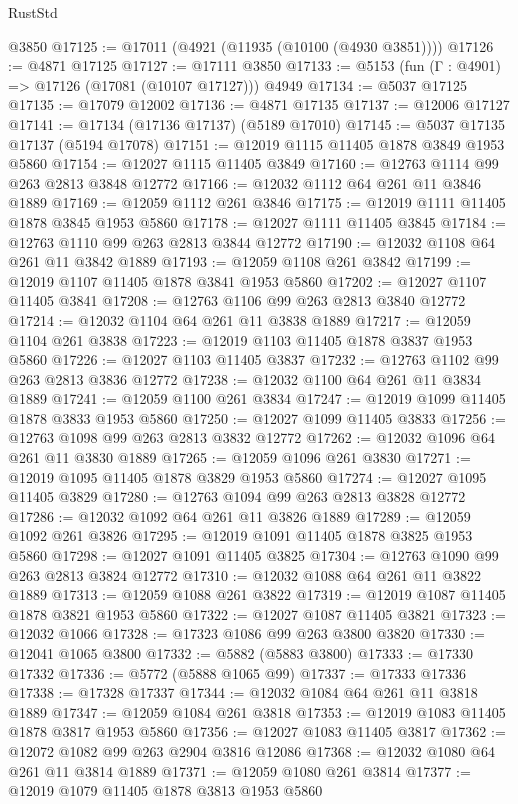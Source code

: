 \begin{lexlean}{RustStd}
\begin{coremodule}
{\begin{coremodule}
{{{{{{{{{{{{{{{{{{{{{{{{{{{{{    @3850
@17125 := @17011 (@4921 (@11935 (@10100 (@4930 @3851))))
@17126 := @4871 @17125
@17127 := @17111 @3850
@17133 := @5153 (fun (Γ : @4901) => @17126 (@17081 (@10107 @17127))) @4949
@17134 := @5037 @17125
@17135 := @17079 @12002
@17136 := @4871 @17135
@17137 := @12006 @17127
@17141 := @17134 (@17136 @17137) (@5189 @17010)
@17145 := @5037 @17135 @17137 (@5194 @17078)
@17151 := @12019 @1115 @11405 @1878 @3849 @1953 @5860
@17154 := @12027 @1115 @11405 @3849
@17160 := @12763 @1114 @99 @263 @2813 @3848 @12772
@17166 := @12032 @1112 @64 @261 @11 @3846 @1889
@17169 := @12059 @1112 @261 @3846
@17175 := @12019 @1111 @11405 @1878 @3845 @1953 @5860
@17178 := @12027 @1111 @11405 @3845
@17184 := @12763 @1110 @99 @263 @2813 @3844 @12772
@17190 := @12032 @1108 @64 @261 @11 @3842 @1889
@17193 := @12059 @1108 @261 @3842
@17199 := @12019 @1107 @11405 @1878 @3841 @1953 @5860
@17202 := @12027 @1107 @11405 @3841
@17208 := @12763 @1106 @99 @263 @2813 @3840 @12772
@17214 := @12032 @1104 @64 @261 @11 @3838 @1889
@17217 := @12059 @1104 @261 @3838
@17223 := @12019 @1103 @11405 @1878 @3837 @1953 @5860
@17226 := @12027 @1103 @11405 @3837
@17232 := @12763 @1102 @99 @263 @2813 @3836 @12772
@17238 := @12032 @1100 @64 @261 @11 @3834 @1889
@17241 := @12059 @1100 @261 @3834
@17247 := @12019 @1099 @11405 @1878 @3833 @1953 @5860
@17250 := @12027 @1099 @11405 @3833
@17256 := @12763 @1098 @99 @263 @2813 @3832 @12772
@17262 := @12032 @1096 @64 @261 @11 @3830 @1889
@17265 := @12059 @1096 @261 @3830
@17271 := @12019 @1095 @11405 @1878 @3829 @1953 @5860
@17274 := @12027 @1095 @11405 @3829
@17280 := @12763 @1094 @99 @263 @2813 @3828 @12772
@17286 := @12032 @1092 @64 @261 @11 @3826 @1889
@17289 := @12059 @1092 @261 @3826
@17295 := @12019 @1091 @11405 @1878 @3825 @1953 @5860
@17298 := @12027 @1091 @11405 @3825
@17304 := @12763 @1090 @99 @263 @2813 @3824 @12772
@17310 := @12032 @1088 @64 @261 @11 @3822 @1889
@17313 := @12059 @1088 @261 @3822
@17319 := @12019 @1087 @11405 @1878 @3821 @1953 @5860
@17322 := @12027 @1087 @11405 @3821
@17323 := @12032 @1066
@17328 := @17323 @1086 @99 @263 @3800 @3820
@17330 := @12041 @1065 @3800
@17332 := @5882 (@5883 @3800)
@17333 := @17330 @17332
@17336 := @5772 (@5888 @1065 @99)
@17337 := @17333 @17336
@17338 := @17328 @17337
@17344 := @12032 @1084 @64 @261 @11 @3818 @1889
@17347 := @12059 @1084 @261 @3818
@17353 := @12019 @1083 @11405 @1878 @3817 @1953 @5860
@17356 := @12027 @1083 @11405 @3817
@17362 := @12072 @1082 @99 @263 @2904 @3816 @12086
@17368 := @12032 @1080 @64 @261 @11 @3814 @1889
@17371 := @12059 @1080 @261 @3814
@17377 := @12019 @1079 @11405 @1878 @3813 @1953 @5860
}}}}}}}}}}}}}}}}}}}}}}}}}}}}}
\end{coremodule}}
\end{coremodule}
\end{lexlean}
